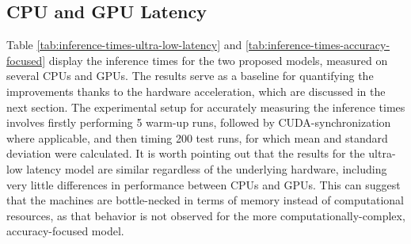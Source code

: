 \subsection{CPU and GPU Latency}
Table \ref{tab:inference-times-ultra-low-latency} and \ref{tab:inference-times-accuracy-focused} display the inference times for the two proposed models, measured on several CPUs and GPUs. The results serve as a baseline for quantifying the improvements thanks to the hardware acceleration, which are discussed in the next section. The experimental setup for accurately measuring the inference times involves firstly performing 5 warm-up runs, followed by CUDA-synchronization where applicable, and then timing 200 test runs, for which mean and standard deviation were calculated. It is worth pointing out that the results for the ultra-low latency model are similar regardless of the underlying hardware, including very little differences in performance between CPUs and GPUs. This can suggest that the machines are bottle-necked in terms of memory instead of computational resources, as that behavior is not observed for the more computationally-complex, accuracy-focused model.

